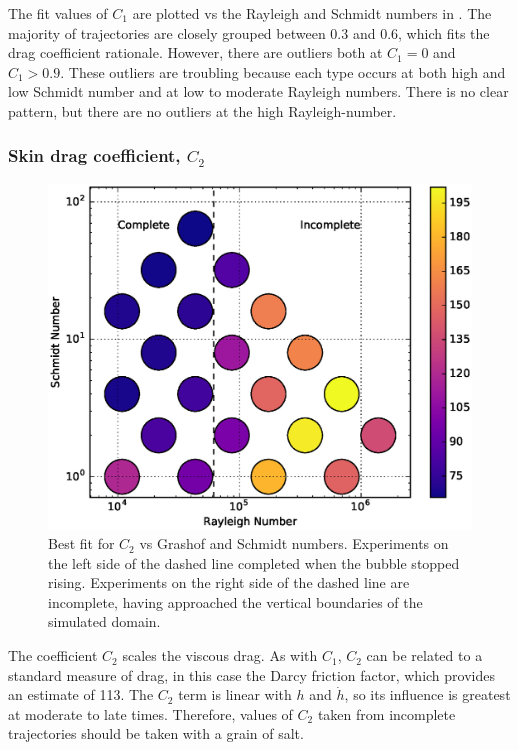 The fit values of $C_1$ are plotted vs the Rayleigh and Schmidt numbers in .
The majority of trajectories are closely grouped between $0.3$ and $0.6$, which fits the drag coefficient rationale.
However, there are outliers both at $C_1 = 0$ and $C_1 > 0.9$.
These outliers are troubling because each type occurs at both high and low Schmidt number and at low to moderate Rayleigh numbers.
There is no clear pattern, but there are no outliers at the high Rayleigh-number.

\subsubsection{Skin drag coefficient, $C_2$}
\begin{figure}
\includegraphics[width=\columnwidth]{figs/C2-vs-Rayleigh-Schmidt}
\caption{ 
  Best fit for $C_2$ vs Grashof and Schmidt numbers.
  Experiments on the left side of the dashed line completed when the bubble stopped rising.
  Experiments on the right side of the dashed line are incomplete, having approached the vertical boundaries of the simulated domain.
}
\end{figure}

The coefficient $C_2$ scales the viscous drag.
As with $C_1$, $C_2$ can be related to a standard measure of drag, in this case the Darcy friction factor, which provides an estimate of 113.
The $C_2$ term is linear with $h$ and $\dot{h}$, so its influence is greatest at moderate to late times.
Therefore, values of $C_2$ taken from incomplete trajectories should be taken with a grain of salt.

